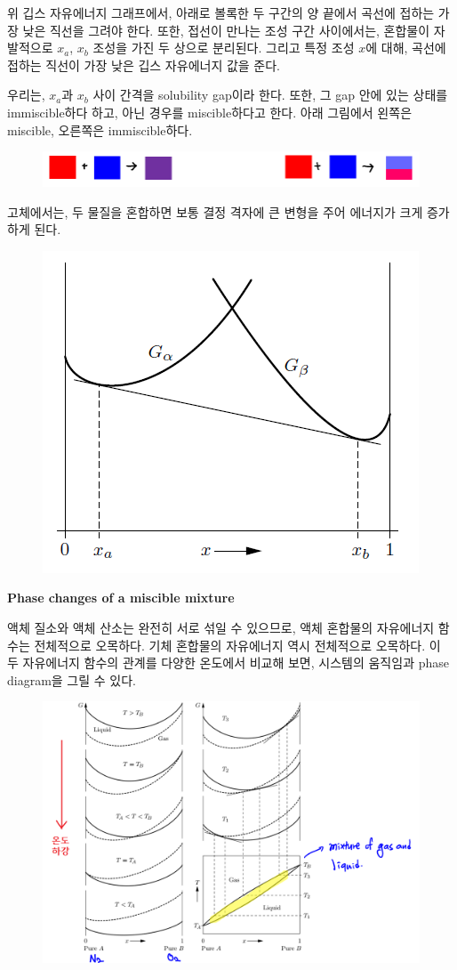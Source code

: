 \documentclass{article}
\begin{document}
위 깁스 자유에너지 그래프에서, 아래로 볼록한 두 구간의 양 끝에서 곡선에 접하는 가장 낮은 직선을 그려야 한다. 또한, 접선이 만나는 조성 구간 사이에서는, 혼합물이 자발적으로 $x_a$, $x_b$ 조성을 가진 두 상으로 분리된다. 그리고 특정 조성 $x$에 대해, 곡선에 접하는 직선이 가장 낮은 깁스 자유에너지 값을 준다.

우리는, $x_a$과 $x_b$ 사이 간격을 solubility gap이라 한다. 또한, 그 gap 안에 있는 상태를 immiscible하다 하고, 아닌 경우를 miscible하다고 한다. 아래 그림에서 왼쪽은 miscible, 오른쪽은 immiscible하다.

\begin{figure}[h]
    \centering
    \includegraphics[width=0.75\linewidth]{images/fig4_5.png}
\end{figure}

\newpage

고체에서는, 두 물질을 혼합하면 보통 결정 격자에 큰 변형을 주어 에너지가 크게 증가하게 된다.

\begin{figure}[h]
    \centering
    \includegraphics[width=0.4\linewidth]{images/fig4_7.png}
\end{figure}

\noindent
\textbf{Phase changes of a miscible mixture}

액체 질소와 액체 산소는 완전히 서로 섞일 수 있으므로, 액체 혼합물의 자유에너지 함수는 전체적으로 오목하다. 기체 혼합물의 자유에너지 역시 전체적으로 오목하다. 이 두 자유에너지 함수의 관계를 다양한 온도에서 비교해 보면, 시스템의 움직임과 phase diagram을 그릴 수 있다.

\begin{figure}[h]
    \centering
    \includegraphics[width=0.9\linewidth]{images/fig4_8.png}
\end{figure}
\end{document}

